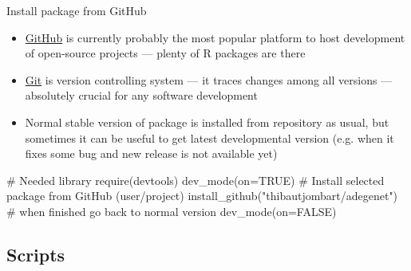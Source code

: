 \documentclass[compress, ucs, xelatex, 11pt, xcolor=svgnames, aspectratio=169,
	hyperref={
		bookmarks=true,
		unicode=true,
		colorlinks=true,
		pdftitle={Molecular data in R},
		plainpages=false,
		pdfauthor={Vojtech Zeisek},
		pdfsubject={Course about phylogeny and evolution in R},
		pdfcreator={XeLaTeX},
		pdfkeywords={R, evolution, phylogeny, molecular data},
		linkcolor=Crimson, %
		anchorcolor=Magenta, %
		citecolor=Magenta, %
		filecolor=Magenta, %
		menucolor=Magenta, %
		urlcolor=DodgerBlue, %
		pdftex},
	url={hyphens, lowtilde} %
	]{beamer}
\begin{document}
\begin{frame}[fragile]{Install package from GitHub}
	\begin{itemize}
		\item \href{https://github.com/}{GitHub} is currently probably the most popular platform to host development of open-source projects --- plenty of R packages are there
		\item \href{https://git-scm.com/}{Git} is version controlling system --- it traces changes among all versions --- absolutely crucial for any software development
		\item Normal stable version of package is installed from repository as usual, but sometimes it can be useful to get latest developmental version (e.g. when it fixes some bug and new release is not available yet)
	\end{itemize}
	\begin{spluscode}
    # Needed library
    require(devtools)
    dev_mode(on=TRUE)
    # Install selected package from GitHub (user/project)
    install_github("thibautjombart/adegenet")
    # when finished go back to normal version
    dev_mode(on=FALSE)
	\end{spluscode}
\end{frame}

\subsection{Scripts}
\end{document}
